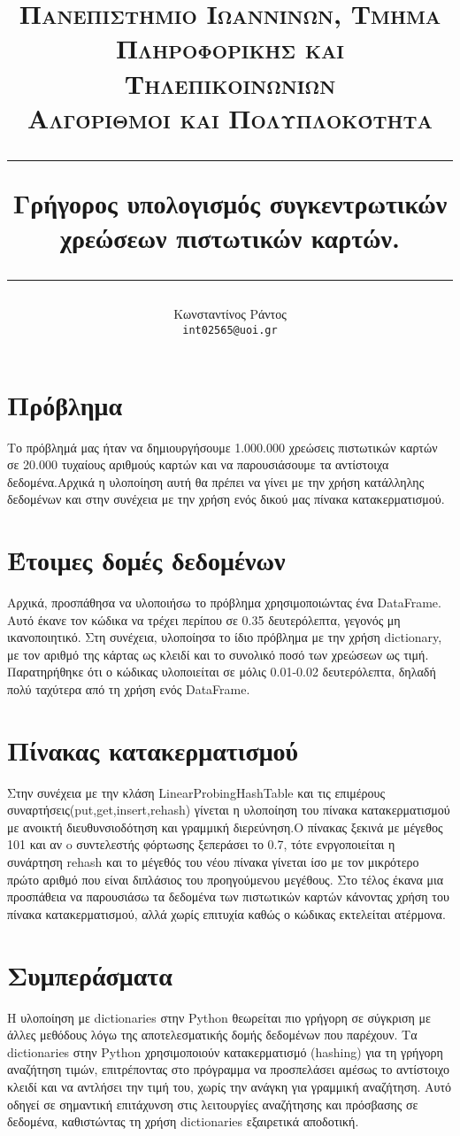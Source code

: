 \documentclass{article}
\title{%
   \normalsize \textsc{Πανεπιστήμιο Ιωαννίνων, Τμήμα Πληροφορικής και Τηλεπικοινωνίων} \\ [1em]
   \normalsize \textsc{Αλγόριθμοι και Πολυπλοκότητα} \\ [1em]
   \vspace{0.5cm}
   \hrule
   \vspace{0.4cm}
   \huge Γρήγορος υπολογισμός συγκεντρωτικών χρεώσεων πιστωτικών καρτών.
   \vspace{0.5cm}
   \hrule
   \vspace{0.5cm}
}
\author{%
   \normalfont
   Κωνσταντίνος Ράντος\\
   \texttt{int02565@uoi.gr}  
}
\date{}
\begin{document}
\maketitle

\section*{Πρόβλημα}
Το πρόβλημά μας ήταν να δημιουργήσουμε 1.000.000 χρεώσεις πιστωτικών καρτών σε 20.000 τυχαίους αριθμούς καρτών και να παρουσιάσουμε τα αντίστοιχα δεδομένα.Αρχικά η υλοποίηση αυτή θα πρέπει να γίνει με την χρήση κατάλληλης δεδομένων και στην συνέχεια με την χρήση ενός δικού μας πίνακα κατακερματισμού.
\vspace{0.5cm}

\section{Έτοιμες δομές δεδομένων}
 Αρχικά, προσπάθησα να υλοποιήσω το πρόβλημα χρησιμοποιώντας ένα DataFrame. Αυτό έκανε τον κώδικα να τρέχει περίπου σε 0.35 δευτερόλεπτα, γεγονός μη ικανοποιητικό. Στη συνέχεια, υλοποίησα το ίδιο πρόβλημα με την χρήση dictionary, με τον αριθμό της κάρτας ως κλειδί και το συνολικό ποσό των χρεώσεων ως τιμή. Παρατηρήθηκε ότι ο κώδικας υλοποιείται σε μόλις 0.01-0.02 δευτερόλεπτα, δηλαδή πολύ ταχύτερα από τη χρήση ενός DataFrame.

\section{Πίνακας κατακερματισμού}
Στην συνέχεια με την κλάση LinearProbingHashTable και τις επιμέρους συναρτήσεις(put,get,insert,rehash) γίνεται η υλοποίηση του πίνακα κατακερματισμού με ανοικτή διευθυνσιοδότηση και γραμμική διερεύνηση.Ο πίνακας ξεκινά με μέγεθος 101 και αν o συντελεστής φόρτωσης ξεπεράσει το 0.7, τότε ενργοποιείται η συνάρτηση rehash και το μέγεθός του νέου πίνακα  γίνεται ίσο με τον μικρότερο πρώτο αριθμό που είναι διπλάσιος του προηγούμενου μεγέθους. Στο τέλος έκανα μια προσπάθεια να παρουσιάσω τα δεδομένα των πιστωτικών καρτών κάνοντας χρήση του πίνακα κατακερματισμού, αλλά χωρίς επιτυχία καθώς ο κώδικας εκτελείται ατέρμονα.

\section{Συμπεράσματα}
   Η υλοποίηση με dictionaries στην Python θεωρείται πιο γρήγορη σε σύγκριση με άλλες μεθόδους λόγω της αποτελεσματικής δομής δεδομένων που παρέχουν. Τα dictionaries στην Python χρησιμοποιούν κατακερματισμό (hashing) για τη γρήγορη αναζήτηση τιμών, επιτρέποντας στο πρόγραμμα να προσπελάσει αμέσως το αντίστοιχο κλειδί και να αντλήσει την τιμή του, χωρίς την ανάγκη για γραμμική αναζήτηση. Αυτό οδηγεί σε σημαντική επιτάχυνση στις λειτουργίες αναζήτησης και πρόσβασης σε δεδομένα, καθιστώντας τη χρήση dictionaries εξαιρετικά αποδοτική.
\end{document}
